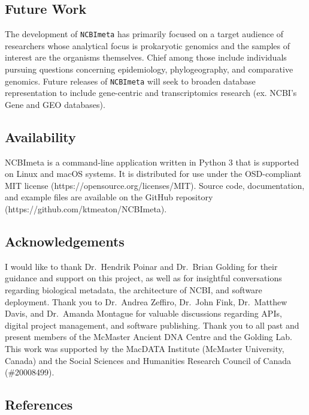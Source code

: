 \documentclass[
]{article}
\begin{document}
\hypertarget{sec:future-work}{%
\subsection{Future Work}\label{sec:future-work}}

The development of \texttt{NCBImeta} has primarily focused on a target
audience of researchers whose analytical focus is prokaryotic genomics
and the samples of interest are the organisms themselves. Chief among
those include individuals pursuing questions concerning epidemiology,
phylogeography, and comparative genomics. Future releases of
\texttt{NCBImeta} will seek to broaden database representation to
include gene-centric and transcriptomics research (ex. NCBI's Gene and
GEO databases).

\hypertarget{sec:availability}{%
\subsection{Availability}\label{sec:availability}}

NCBImeta is a command-line application written in Python 3 that is
supported on Linux and macOS systems. It is distributed for use under
the OSD-compliant MIT license (https://opensource.org/licenses/MIT).
Source code, documentation, and example files are available on the
GitHub repository (https://github.com/ktmeaton/NCBImeta).

\hypertarget{sec:acknowledgements}{%
\subsection{Acknowledgements}\label{sec:acknowledgements}}

I would like to thank Dr.~Hendrik Poinar and Dr.~Brian Golding for their
guidance and support on this project, as well as for insightful
conversations regarding biological metadata, the architecture of NCBI,
and software deployment. Thank you to Dr.~Andrea Zeffiro, Dr.~John Fink,
Dr.~Matthew Davis, and Dr.~Amanda Montague for valuable discussions
regarding APIs, digital project management, and software publishing.
Thank you to all past and present members of the McMaster Ancient DNA
Centre and the Golding Lab. This work was supported by the MacDATA
Institute (McMaster University, Canada) and the Social Sciences and
Humanities Research Council of Canada (\#20008499).

\hypertarget{sec:references}{%
\subsection*{References}\label{sec:references}}
\end{document}
